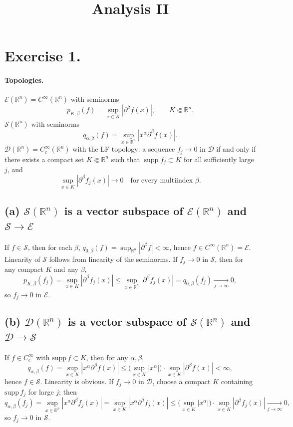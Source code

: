 \documentclass[12pt,a4paper]{article}
\title{\Large Analysis II}
\author{}
\date{}
\theoremstyle{plain}
\theoremstyle{definition}
\theoremstyle{remark}
\theoremstyle{remark}
\begin{document}
	
	\maketitle


\section*{Exercise 1.}

\paragraph{Topologies.}
$\mathcal{E}(\mathbb{R}^n) = C^\infty(\mathbb{R}^n)$ with seminorms
\[
p_{K,\beta}(f) = \sup_{x \in K} |\partial^\beta f(x)|, \qquad K \Subset \mathbb{R}^n.
\]
$\mathcal{S}(\mathbb{R}^n)$ with seminorms
\[
q_{\alpha,\beta}(f) = \sup_{x \in \mathbb{R}^n} |x^\alpha \partial^\beta f(x)|.
\]
$\mathcal{D}(\mathbb{R}^n) = C_c^\infty(\mathbb{R}^n)$ with the LF topology:
a sequence $f_j \to 0$ in $\mathcal{D}$ if and only if there exists a compact set
$K \Subset \mathbb{R}^n$ such that $\operatorname{supp} f_j \subset K$ for all sufficiently large $j$,
and
\[
\sup_{x \in K} |\partial^\beta f_j(x)| \to 0
\quad \text{for every multiindex } \beta.
\]

\subsection*{(a) $\mathcal S(\mathbb R^n)$ is a vector subspace of $\mathcal E(\mathbb R^n)$ and $\mathcal S\!\to\!\mathcal E$}
If $f\in\mathcal S$, then for each $\beta$, $q_{0,\beta}(f)=\sup_{\mathbb R^n}|\partial^\beta f|<\infty$, hence $f\in C^\infty(\mathbb R^n)=\mathcal E$.
Linearity of $\mathcal S$ follows from linearity of the seminorms.
If $f_j\to0$ in $\mathcal S$, then for any compact $K$ and any $\beta$,
\[
p_{K,\beta}(f_j)=\sup_{x\in K}|\partial^\beta f_j(x)|\le \sup_{x\in\mathbb R^n}|\partial^\beta f_j(x)|
=q_{0,\beta}(f_j)\xrightarrow[j\to\infty]{}0,
\]
so $f_j\to0$ in $\mathcal E$.

\subsection*{(b) $\mathcal D(\mathbb R^n)$ is a vector subspace of $\mathcal S(\mathbb R^n)$ and $\mathcal D\!\to\!\mathcal S$}
If $f\in C_c^\infty$ with $\mathrm{supp}\,f\subset K$, then for any $\alpha,\beta$,
\[
q_{\alpha,\beta}(f)=\sup_{x\in K}|x^\alpha\partial^\beta f(x)|
\le \Big(\sup_{x\in K}|x^\alpha|\Big)\cdot \sup_{x\in K}|\partial^\beta f(x)|<\infty,
\]
hence $f\in\mathcal S$. Linearity is obvious.
If $f_j\to0$ in $\mathcal D$, choose a compact $K$ containing $\mathrm{supp}\,f_j$ for large $j$;
then
\[
q_{\alpha,\beta}(f_j)=\sup_{x\in\mathbb R^n}|x^\alpha\partial^\beta f_j(x)|
=\sup_{x\in K}|x^\alpha\partial^\beta f_j(x)|
\le \Big(\sup_{x\in K}|x^\alpha|\Big)\cdot \sup_{x\in K}|\partial^\beta f_j(x)|\xrightarrow[j\to\infty]{}0,
\]
so $f_j\to0$ in $\mathcal S$.
\end{document}
